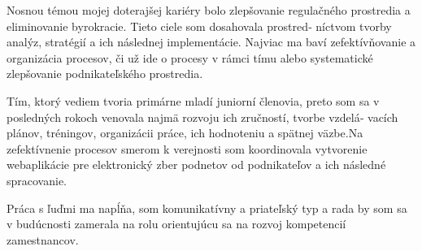 

\begin{cvparagraph}

Nosnou témou mojej doterajšej kariéry bolo zlepšovanie regulačného prostredia a eliminovanie byrokracie. Tieto ciele som dosahovala prostred‐
níctvom tvorby analýz, stratégií a ich následnej implementácie. Najviac ma baví zefektívňovanie a organizácia procesov, či už ide o procesy v rámci
tímu alebo systematické zlepšovanie podnikateľského prostredia.

Tím, ktorý vediem tvoria primárne mladí juniorní členovia, preto som sa v posledných rokoch venovala najmä rozvoju ich zručností, tvorbe vzdelá‐
vacích plánov, tréningov, organizácii práce, ich hodnoteniu a spätnej väzbe.Na zefektívnenie procesov smerom k verejnosti som koordinovala
vytvorenie webaplikácie pre elektronický zber podnetov od podnikateľov a ich následné spracovanie.

Práca s ľuďmi ma napĺňa, som komunikatívny a priateľský typ a rada by som sa v budúcnosti zamerala na rolu orientujúcu sa na rozvoj kompetencií
zamestnancov.
\end{cvparagraph}
